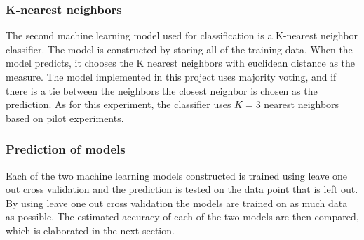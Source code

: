 \documentclass[11pt, fleqn, titlepage]{article}
\begin{document}
\subsubsection*{K-nearest neighbors}  \vspace*{-0.2cm}
The second machine learning model used for classification is a K-nearest neighbor classifier. The model is constructed by storing all of the training data. When the model predicts, it chooses the K nearest neighbors with euclidean distance as the measure. The model implemented in this project uses majority voting, and if there is a tie between the neighbors the closest neighbor is chosen as the prediction. As for this experiment, the classifier uses $ K=3 $ nearest neighbors based on pilot experiments.
\vspace*{-0.2cm}
\subsubsection*{Prediction of models}  \vspace*{-0.2cm}
Each of the two machine learning models constructed is trained using leave one out cross validation and the prediction is tested on the data point that is left out. By using leave one out cross validation the models are trained on as much data as possible. The estimated accuracy of each of the two models are then compared, which is elaborated in the next section.
\vspace*{-0.2cm}
\end{document}
